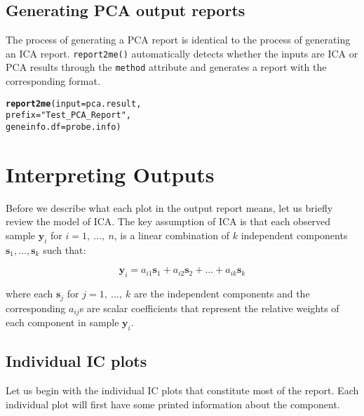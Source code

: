 \documentclass[11pt, oneside]{article}\usepackage[]{graphicx}\usepackage[]{color}
\makeatletter
\newcommand{\hlstr}[1]{\textcolor[rgb]{0.192,0.494,0.8}{#1}}%
\newcommand{\hlstd}[1]{\textcolor[rgb]{0.345,0.345,0.345}{#1}}%
\newcommand{\hlkwc}[1]{\textcolor[rgb]{0.333,0.667,0.333}{#1}}%
\newcommand{\hlkwd}[1]{\textcolor[rgb]{0.737,0.353,0.396}{\textbf{#1}}}%
\newenvironment{kframe}{%
 \def\at@end@of@kframe{}%
 \ifinner\ifhmode%
  \def\at@end@of@kframe{\end{minipage}}%
  \begin{minipage}{\columnwidth}%
 \fi\fi%
 \def\FrameCommand##1{\hskip\@totalleftmargin \hskip-\fboxsep
 \colorbox{shadecolor}{##1}\hskip-\fboxsep
     \hskip-\linewidth \hskip-\@totalleftmargin \hskip\columnwidth}%
 \MakeFramed {\advance\hsize-\width
   \@totalleftmargin\z@ \linewidth\hsize
   \@setminipage}}%
 {\par\unskip\endMakeFramed%
 \at@end@of@kframe}
\newenvironment{knitrout}{}{} %
\makeatother
\begin{document}
\subsection{Generating PCA output reports}

The process of generating a PCA report is identical to the process of generating an ICA report. \verb|report2me()| automatically detects whether the inputs are ICA or PCA results through the \verb|method| attribute and generates a report with the corresponding format.

\begin{knitrout}
\color{fgcolor}\begin{kframe}
\begin{alltt}
\hlkwd{report2me}\hlstd{(}\hlkwc{input} \hlstd{= pca.result,}
          \hlkwc{prefix} \hlstd{=} \hlstr{"Test_PCA_Report"}\hlstd{,}
          \hlkwc{geneinfo.df} \hlstd{= probe.info)}
\end{alltt}
\end{kframe}
\end{knitrout}

\section{Interpreting Outputs}

Before we describe what each plot in the output report means, let us briefly review the model of ICA. The key assumption of ICA is that each observed sample $\mathbf{y}_i$ for $i = 1,\ ...,\ n$, is a linear combination of $k$ independent components $\mathbf{s}_1,...,\mathbf{s}_k$ such that:

\begin{equation}
  \mathbf{y}_i = a_{i1}\mathbf{s}_1 + a_{i2}\mathbf{s}_2 + ... + a_{ik}\mathbf{s}_k
\end{equation}

where each $\mathbf{s}_j$ for $j = 1,\ ...,\ k $ are the independent components and the corresponding $a_{ij}$s are scalar coefficients that represent the relative weights of each component in sample $\mathbf{y}_i$. 

\subsection{Individual IC plots}

Let us begin with the individual IC plots that constitute most of the report. Each individual plot will first have some printed information about the component. 
\end{document}
